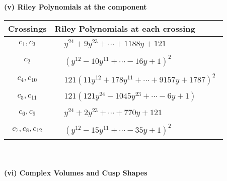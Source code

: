\documentclass[1p]{elsarticle_modified}
\theoremstyle{definition}
\begin{document}
\newpage\renewcommand{\arraystretch}{1}
\flushleft \textbf{(v) Riley Polynomials at the component}\newline \\
\begin{tabular}{m{50pt}|m{274pt}}
Crossings & \hspace{64pt}Riley Polynomials at each crossing \\
\hline $$\begin{aligned}c_{1},c_{3}\end{aligned}$$&$\begin{aligned}
&y^{24}+9 y^{23}+\cdots+1188 y+121
\end{aligned}$\\
\hline $$\begin{aligned}c_{2}\end{aligned}$$&$\begin{aligned}
&(y^{12}-10 y^{11}+\cdots-16 y+1)^{2}
\end{aligned}$\\
\hline $$\begin{aligned}c_{4},c_{10}\end{aligned}$$&$\begin{aligned}
&121(11 y^{12}+178 y^{11}+\cdots+9157 y+1787)^{2}
\end{aligned}$\\
\hline $$\begin{aligned}c_{5},c_{11}\end{aligned}$$&$\begin{aligned}
&121(121 y^{24}-1045 y^{23}+\cdots-6 y+1)
\end{aligned}$\\
\hline $$\begin{aligned}c_{6},c_{9}\end{aligned}$$&$\begin{aligned}
&y^{24}+2 y^{23}+\cdots+770 y+121
\end{aligned}$\\
\hline $$\begin{aligned}c_{7},c_{8},c_{12}\end{aligned}$$&$\begin{aligned}
&(y^{12}-15 y^{11}+\cdots-35 y+1)^{2}
\end{aligned}$\\
\hline
\end{tabular}\\~\\
\newpage\flushleft \textbf{(vi) Complex Volumes and Cusp Shapes}
\end{document}
